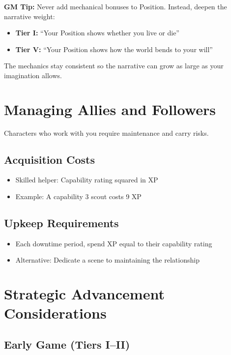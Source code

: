 \documentclass[11pt,twoside,openany]{book}
\begin{document}
\begin{tcolorbox}[colback=blue!5!white, colframe=blue!75!black, boxrule=0.5pt, arc=2mm,breakable]
\textbf{GM Tip:} Never add mechanical bonuses to Position. Instead, deepen the narrative weight:
\begin{itemize}
\item \textbf{Tier I:} ``Your Position shows whether you live or die''
\item \textbf{Tier V:} ``Your Position shows how the world bends to your will''
\end{itemize}
The mechanics stay consistent so the narrative can grow as large as your imagination allows.
\end{tcolorbox}

\section*{Managing Allies and Followers} 

Characters who work with you require maintenance and carry risks.

\subsection*{Acquisition Costs}

\begin{itemize}
\item Skilled helper: Capability rating squared in XP
\item Example: A capability 3 scout costs 9 XP
\end{itemize}

\subsection*{Upkeep Requirements}

\begin{itemize}
\item Each downtime period, spend XP equal to their capability rating
\item Alternative: Dedicate a scene to maintaining the relationship
\end{itemize}

\section*{Strategic Advancement Considerations} 

\subsection*{Early Game (Tiers I--II)}
\end{document}
